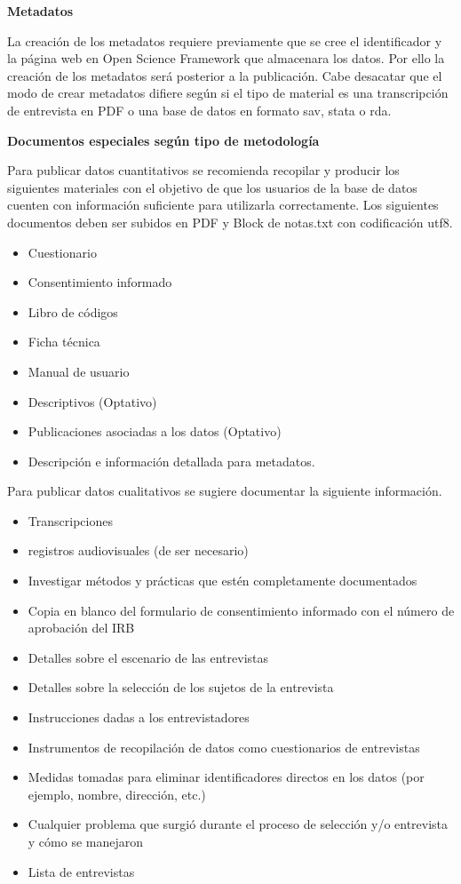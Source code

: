 \documentclass[
  spanish,
  a4paper,
  oneside]{scrbook}
\providecommand{\tightlist}{%
  \setlength{\itemsep}{0pt}\setlength{\parskip}{0pt}}
\begin{document}
\textbf{Metadatos}

La creación de los metadatos requiere previamente que se cree el
identificador y la página web en Open Science Framework que almacenara
los datos. Por ello la creación de los metadatos será posterior a la
publicación. Cabe desacatar que el modo de crear metadatos difiere según
si el tipo de material es una transcripción de entrevista en PDF o una
base de datos en formato sav, stata o rda.

\textbf{Documentos especiales según tipo de metodología}

Para publicar datos cuantitativos se recomienda recopilar y producir los
siguientes materiales con el objetivo de que los usuarios de la base de
datos cuenten con información suficiente para utilizarla correctamente.
Los siguientes documentos deben ser subidos en PDF y Block de notas.txt
con codificación utf8.

\begin{itemize}
\tightlist
\item
  Cuestionario
\item
  Consentimiento informado
\item
  Libro de códigos
\item
  Ficha técnica
\item
  Manual de usuario
\item
  Descriptivos (Optativo)
\item
  Publicaciones asociadas a los datos (Optativo)
\item
  Descripción e información detallada para metadatos.
\end{itemize}

Para publicar datos cualitativos se sugiere documentar la siguiente
información.

\begin{itemize}
\item
  Transcripciones
\item
  registros audiovisuales (de ser necesario)
\item
  Investigar métodos y prácticas que estén completamente documentados
\item
  Copia en blanco del formulario de consentimiento informado con el
  número de aprobación del IRB
\item
  Detalles sobre el escenario de las entrevistas
\item
  Detalles sobre la selección de los sujetos de la entrevista
\item
  Instrucciones dadas a los entrevistadores
\item
  Instrumentos de recopilación de datos como cuestionarios de
  entrevistas
\item
  Medidas tomadas para eliminar identificadores directos en los datos
  (por ejemplo, nombre, dirección, etc.)
\item
  Cualquier problema que surgió durante el proceso de selección y/o
  entrevista y cómo se manejaron
\item
  Lista de entrevistas
\end{itemize}
\end{document}
